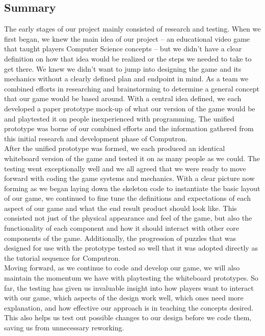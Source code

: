 \subsection{Summary}
The early stages of our project mainly consisted of research and testing. When we first began, we knew the main idea of our project -- an educational video game that taught players Computer Science concepts -- but we didn't have a clear definition on how that idea would be realized or the steps we needed to take to get there. We knew we didn't want to jump into designing the game and its mechanics without a clearly defined plan and endpoint in mind. As a team we combined efforts in researching and brainstorming to determine a general concept that our game would be based around. With a central idea defined, we each developed a paper prototype mock-up of what our version of the game would be and playtested it on people inexperienced with programming. The unified prototype was borne of our combined efforts and the information gathered from this initial research and development phase of Computron.\\

After the unified prototype was formed, we each produced an identical whiteboard version of the game and tested it on as many people as we could. The testing went exceptionally well and we all agreed that we were ready to move forward with coding the game systems and mechanics. With a clear picture now forming as we began laying down the skeleton code to instantiate the basic layout of our game, we continued to fine tune the definitions and expectations of each aspect of our game and what the end result product should look like. This consisted not just of the physical appearance and feel of the game, but also the functionality of each component and how it should interact with other core components of the game. Additionally, the progression of puzzles that was designed for use with the prototype tested so well that it was adopted directly as the tutorial sequence for Computron.\\

Moving forward, as we continue to code and develop our game, we will also maintain the momentum we have with playtesting the whiteboard prototypes. So far, the testing has given us invaluable insight into how players want to interact with our game, which aspects of the design work well, which ones need more explanation, and how effective our approach is in teaching the concepts desired. This also helps us test out possible changes to our design before we code them, saving us from unnecessary reworking.\\

